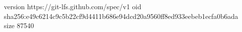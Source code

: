 version https://git-lfs.github.com/spec/v1
oid sha256:e49c6214c9c5b22cf9d4411b686e94dcd20a9560ff8ed933eebeb1ecfa0b6ada
size 87540
